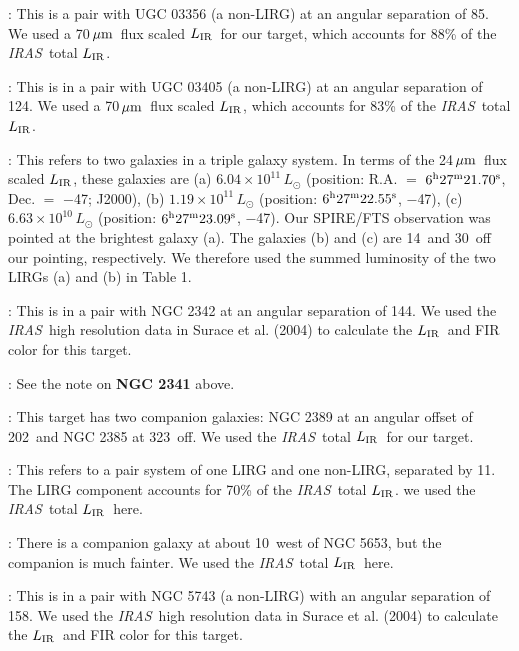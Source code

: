 \documentclass[preprint]{aastex}
\newcommand{\um}{\mbox{$\,\mu{\rm m}$}}
\newcommand{\IRAS}{{\it IRAS}}
\newcommand{\LIR}{\mbox{$L_{\rm IR}$}}
\begin{document}
: This is a pair with UGC 03356 (a non-LIRG) at an angular separation of 85\arcsec.
          We used a 70\um\ flux scaled \LIR\ for our target, which accounts for 88\% of the \IRAS\ total
          \LIR.

: This is in a pair with UGC 03405 (a non-LIRG) at an angular separation of 124\arcsec.
          We used a 70\um\ flux scaled \LIR, which accounts for 83\% of the \IRAS\ total \LIR.

: This refers to two galaxies in a triple galaxy system. In terms of the 24\um\ flux scaled
          \LIR, these galaxies are (a) $6.04 \times 10^{11}\,L_{\odot}$ (position: R.A. $=$ 
	   $6^{\rm h}27^{\rm m}21.70^{\rm s}$,  Dec. $=$ 
           $-$47\arcsec; J2000), (b) $1.19 \times 10^{11}\,L_{\odot}$ (position: 
	   $6^{\rm h}27^{\rm m}22.55^{\rm s}$,  $-$47\arcsec), (c) 
	   $6.63 \times 10^{10}\,L_{\odot}$ (position: 
	   $6^{\rm h}27^{\rm m}23.09^{\rm s}$,  $-$47\arcsec).   Our SPIRE/FTS observation 
           was pointed at the brightest galaxy (a).  The galaxies (b) and (c) are 14\arcsec\ and 30\arcsec\ off 
	     our pointing, respectively.   We therefore used the summed luminosity of the two LIRGs (a) and (b) in Table 1.

: This is in a pair with NGC 2342 at an angular separation of 144\arcsec. We used the \IRAS\ high resolution
	    data in Surace et al. (2004) to calculate the \LIR\ and FIR color for this target.

: See the note on {\bf NGC 2341} above.

: This target has two companion galaxies: NGC 2389 at an angular offset of 202\arcsec\ and NGC 2385 
	    at 323\arcsec\ off. We used the \IRAS\ total \LIR\ for our target.

: This refers to a pair system of one LIRG and one non-LIRG, separated by 11\arcsec. 
	  The LIRG component accounts for 70\% of the \IRAS\ total \LIR. we used the \IRAS\ total \LIR\ here.

:  There is a companion galaxy at about 10\arcsec\ west of NGC 5653, but the companion is much fainter.
          We used the \IRAS\ total \LIR\ here.

:  This is in a pair with NGC 5743 (a non-LIRG) with an angular separation of 158\arcsec. We used 
	    the \IRAS\ high resolution data in Surace et al. (2004) to calculate the \LIR\ and FIR color for this target.
\end{document}

